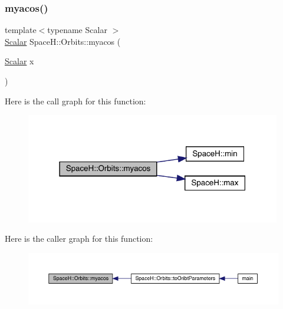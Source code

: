 \subsubsection{\texorpdfstring{myacos()}{myacos()}}
{\footnotesize\ttfamily template$<$typename Scalar $>$ \\
\mbox{\hyperlink{create_kepler_8cpp_a8c2981f3f834be9448a6ab06c28748eb}{Scalar}} Space\+H\+::\+Orbits\+::myacos (\begin{DoxyParamCaption}\item[{\mbox{\hyperlink{create_kepler_8cpp_a8c2981f3f834be9448a6ab06c28748eb}{Scalar}}}]{x }\end{DoxyParamCaption})\hspace{0.3cm}{\ttfamily [inline]}}

Here is the call graph for this function\+:
\nopagebreak
\begin{figure}[H]
\begin{center}
\leavevmode
\includegraphics[width=316pt]{namespace_space_h_1_1_orbits_a678a54bbf3a8637d6437b4b8b4a39d97_cgraph}
\end{center}
\end{figure}
Here is the caller graph for this function\+:
\nopagebreak
\begin{figure}[H]
\begin{center}
\leavevmode
\includegraphics[width=350pt]{namespace_space_h_1_1_orbits_a678a54bbf3a8637d6437b4b8b4a39d97_icgraph}
\end{center}
\end{figure}
\mbox{\label{namespace_space_h_1_1_orbits_a5e8b37a1237e17770907f5c2adbb53d6}} 
